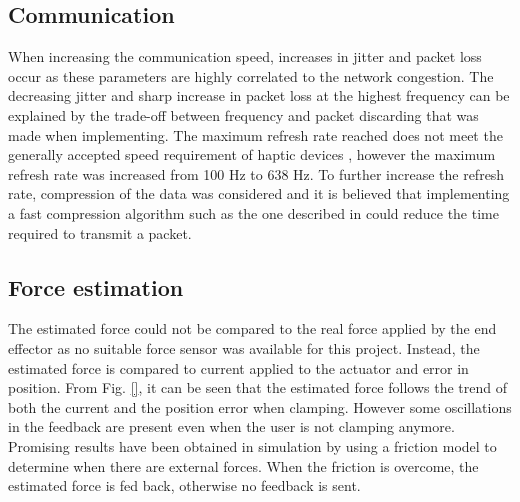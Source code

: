 
\subsection*{Communication}

When increasing the communication speed, increases in jitter and packet loss occur as these parameters are highly correlated to the network congestion. %
The decreasing jitter and sharp increase in packet loss at the highest frequency can be explained by the trade-off between frequency and packet discarding that was made when implementing.
The maximum refresh rate reached does not meet the generally accepted speed requirement of haptic devices \cite{coles2011role}, however the maximum refresh rate was increased from 100 Hz to 638 Hz.
To further increase the refresh rate, compression of the data was considered and it is believed that implementing a fast compression algorithm such as the one described in \cite{fast_ZIV} could reduce the time required to transmit a packet.

\subsection*{Force estimation}

The estimated force could not be compared to the real force applied by the end effector as no suitable force sensor was available for this project. Instead, the estimated force is compared to current applied to the actuator and error in position. From Fig. \ref{}, it can be seen that the estimated force follows the trend of both the current and the position error when clamping. However some oscillations in the feedback are present even when the user is not clamping anymore. Promising results have been obtained in simulation by using a friction model to determine when there are external forces. When the friction is overcome, the estimated force is fed back, otherwise no feedback is sent.